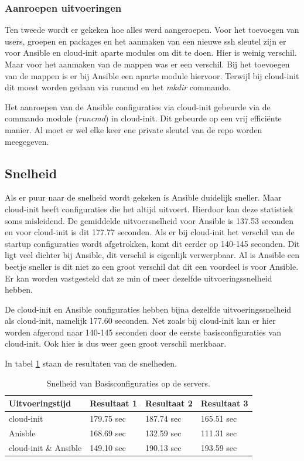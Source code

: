 \subsubsection{Aanroepen uitvoeringen}
Ten tweede wordt er gekeken hoe alles werd aangeroepen. Voor het toevoegen van users, groepen en packages en het aanmaken van een nieuwe ssh sleutel zijn er voor Ansible en cloud-init aparte modules om dit te doen. Hier is weinig verschil. Maar voor het aanmaken van de mappen was er een verschil. Bij het toevoegen van de mappen is er bij Ansible een aparte module hiervoor. Terwijl bij cloud-init dit moest worden gedaan via runcmd en het \textit{mkdir} commando. 

Het aanroepen van de Ansible configuraties via cloud-init gebeurde via de commando module (\textit{runcmd}) in cloud-init. Dit gebeurde op een vrij efficiënte manier. Al moet er wel elke keer ene private sleutel van de repo worden meegegeven.

\subsection{Snelheid}
Als er puur naar de snelheid wordt gekeken is Ansible duidelijk sneller. Maar cloud-init heeft configuraties die het altijd uitvoert. Hierdoor kan deze statistiek soms misleidend. De gemiddelde uitvoersnelheid voor Ansible is 137.53 seconden en voor cloud-init is dit 177.77 seconden. Als er bij cloud-init het verschil van de startup configuraties wordt afgetrokken, komt dit eerder op 140-145 seconden. Dit ligt veel dichter bij Ansible, dit verschil is eigenlijk verwerpbaar. Al is Ansible een beetje sneller is dit niet zo een groot verschil dat dit een voordeel is voor Ansible. Er kan worden vastgesteld dat ze min of meer dezelfde uitvoeringssnelheid hebben.

De cloud-init en Ansible configuraties hebben bijna dezelfde uitvoeringssnelheid als cloud-init, namelijk 177.60 seconden. Net zoals bij cloud-init kan er hier worden afgerond naar 140-145 seconden door de eerste basisconfiguraties van cloud-init. Ook hier is dus weer geen groot verschil merkbaar.

In tabel \ref{tab:tabel resultaten basis} staan de resultaten van de snelheden.

\begin{table}[!htb]
    \centering
    \begin{tabular}{| l | l | l |l |}
        \hline
        \textbf{Uitvoeringstijd} & Resultaat 1 & Resultaat 2 & Resultaat 3   \\ \hline
        cloud-init & 179.75 sec & 187.74 sec & 165.51 sec  \\ \hline
        Anisble & 168.69 sec & 132.59 sec & 111.31 sec \\ \hline
        cloud-init \& Ansible & 149.10 sec & 190.13 sec & 193.59 sec \\
        \hline
    \end{tabular}
    \caption{Snelheid van Basisconfiguraties op de servers.}
    \label{tab:tabel resultaten basis}
\end{table}

